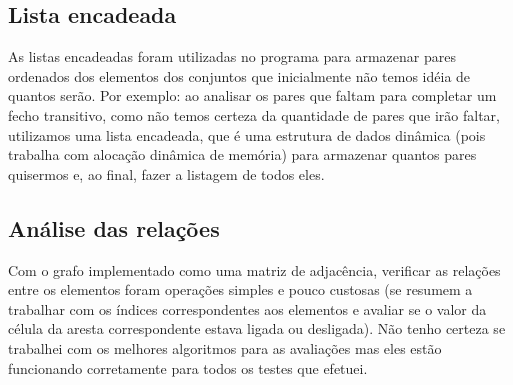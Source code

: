 \documentclass[12pt]{article}
\begin{document}
\subsection{Lista encadeada}

As listas encadeadas foram utilizadas no programa para armazenar pares ordenados dos 
elementos dos conjuntos que inicialmente não temos idéia de quantos serão.
Por exemplo: ao analisar os pares que faltam para completar um fecho transitivo, 
como não temos certeza da quantidade de pares que irão faltar, utilizamos uma
lista encadeada, que é uma estrutura de dados dinâmica (pois trabalha com alocação 
dinâmica de memória) para armazenar quantos pares quisermos e, ao final, fazer
a listagem de todos eles.

\subsection{Análise das relações}

Com o grafo implementado como uma matriz de adjacência, verificar as relações entre 
os elementos foram operações simples e pouco custosas (se resumem a trabalhar
com os índices correspondentes aos elementos e avaliar se o valor da célula da aresta 
correspondente estava ligada ou desligada). Não tenho certeza se trabalhei
com os melhores algoritmos para as avaliações mas eles estão funcionando corretamente 
para todos os testes que efetuei.

\subsubsection{}
\end{document}

